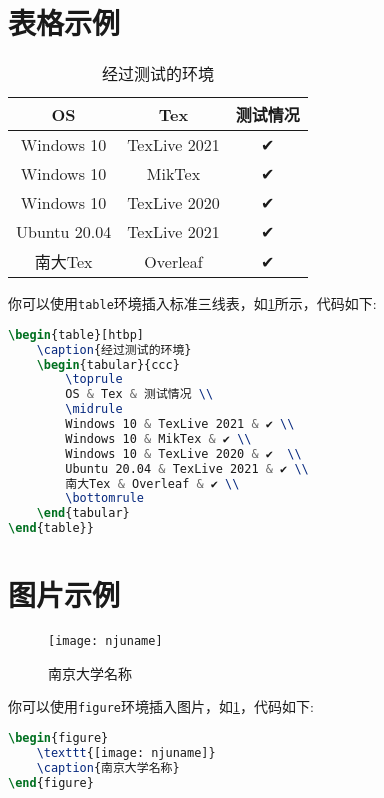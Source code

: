 \documentclass[
    TitleLength=1,%
    Degree=UG,%
    Type=thesis%
]{njuthesis}
\begin{document}
\section{表格示例}
\begin{table}[htbp]
    \caption{经过测试的环境}
    \label{tab:mytab}
    \begin{tabular}{ccc}
        \toprule
        OS & Tex & 测试情况 \\
        \midrule
        Windows 10 & TexLive 2021 & ✔ \\
        Windows 10 & MikTex & ✔ \\
        Windows 10 & TexLive 2020 & ✔  \\
        Ubuntu 20.04 & TexLive 2021 & ✔ \\
        南大Tex & Overleaf & ✔ \\
        \bottomrule
    \end{tabular}
\end{table}
你可以使用\lstinline|table|环境插入标准三线表，如\cref{tab:mytab}所示，代码如下:
\begin{lstlisting}[language=TeX]
\begin{table}[htbp]
    \caption{经过测试的环境}
    \begin{tabular}{ccc}
        \toprule
        OS & Tex & 测试情况 \\
        \midrule
        Windows 10 & TexLive 2021 & ✔ \\
        Windows 10 & MikTex & ✔ \\
        Windows 10 & TexLive 2020 & ✔  \\
        Ubuntu 20.04 & TexLive 2021 & ✔ \\
        南大Tex & Overleaf & ✔ \\
        \bottomrule
    \end{tabular}
\end{table}}
\end{lstlisting}

\section{图片示例}
\label{sec:figures}
\begin{figure}[htbp]
    \texttt{[image: njuname]}
    \caption{南京大学名称}
    \label{fig:njuname}
\end{figure}
你可以使用\lstinline|figure|环境插入图片，如\cref{fig:njuname}，代码如下:
\begin{lstlisting}[language=TeX]
\begin{figure}
    \texttt{[image: njuname]}
    \caption{南京大学名称}
\end{figure}
\end{lstlisting}
\end{document}
